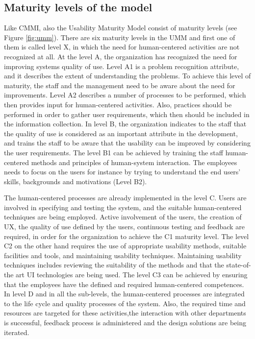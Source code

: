\documentclass[12pt,a4paper,oneside,pdftex]{report}
\begin{document}
 \subsection{Maturity levels of the model}
Like CMMI, also the Usability Maturity Model consist of maturity levels (see Figure \ref{fig:umm}). There are six maturity levels in the UMM and first one of them is called level X, in which the need for human-centered activities are not recognized at all. At the level A, the organization has recognized the need for improving systems quality of use. Level A1 is a problem recognition attribute, and it describes the extent of understanding the problems. To achieve this level of maturity, the staff and the management need to be aware about the need for improvements. Level A2 describes a number of processes to be performed, which then provides input for human-centered activities. Also, practices should be performed in order to gather user requirements, which then should be included in the information collection. In level B, the organization indicates to the staff that the quality of use is considered as an important attribute in the development, and trains the staff to be aware that the usability can be improved by considering the user requirements. The level B1 can be achieved by training the staff human-centered methods and principles of human-system interaction. The employees needs to focus on the users for instance by trying to understand the end users' skills, backgrounds and motivations (Level B2). \cite{RefWorks:30}

The human-centered processes are already implemented in the level C. Users are involved in specifying and testing the system, and the suitable human-centered techniques are being employed. Active involvement of the users, the creation of UX, the quality of use defined by the users, continuous testing and feedback are required, in order for the organization to achieve the C1 maturity level. The level C2 on the other hand requires the use of appropriate usability methods, suitable facilities and tools, and maintaining usability techniques. Maintaining usability techniques includes reviewing the suitability of the methods and that the state-of-the  art UI technologies are being used. The level C3 can be achieved by ensuring that the employees have the defined and required human-centered competences. In level D and in all the sub-levels, the human-centered processes are integrated to the life cycle and quality processes of the system. Also, the required time and resources are targeted for these activities,the interaction with other departments is successful, feedback process is administered and the design solutions are being iterated. \cite{RefWorks:30}
\end{document}
